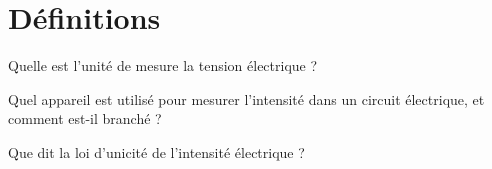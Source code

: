 \section{Définitions}


\begin{questions}
	\question Quelle est l'unité de mesure la tension électrique ?
	\fillwithdottedlines{1cm}
	
	\question Quel appareil est utilisé pour mesurer l'intensité dans un circuit électrique, et comment est-il branché ?
	\fillwithdottedlines{1.5cm}

	\question Que dit la loi d'unicité de l'intensité électrique ?	
	\fillwithdottedlines{2cm}
	
	
\end{questions}
